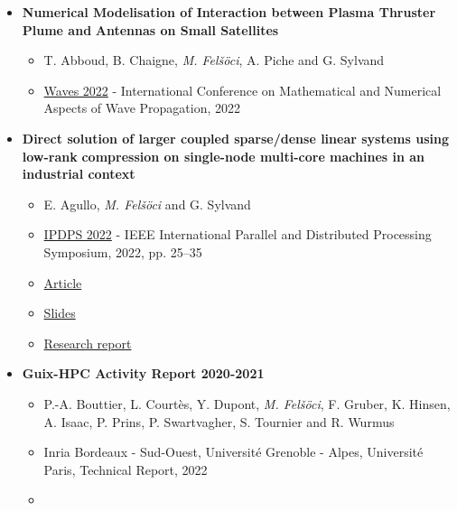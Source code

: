 \documentclass[a4paper, 11pt]{article}
\begin{document}
\begin{itemize}
\item \textbf{Numerical Modelisation of Interaction between Plasma Thruster Plume and}
\textbf{Antennas on Small Satellites}
\begin{itemize}
\item T. Abboud, B. Chaigne, \emph{M. Felšöci}, A. Piche and G. Sylvand
\item \href{https://waves2022.apps.math.cnrs.fr/}{Waves 2022} - International
Conference on Mathematical and Numerical Aspects of Wave Propagation, 2022
\end{itemize}
\item \textbf{Direct solution of larger coupled sparse/dense linear systems using low-rank}
\textbf{compression on single-node multi-core machines in an industrial context}
\begin{itemize}
\item E. Agullo, \emph{M. Felšöci} and G. Sylvand
\item \href{http://www.ipdps.org/ipdps2022/index.html}{IPDPS 2022} - IEEE
International Parallel and Distributed Processing Symposium, 2022,
pp. 25–35
\item \begin{center}
\end{center}
\href{https://doi.ieeecomputersociety.org/10.1109/IPDPS53621.2022.00012}{Article}
\item \begin{center}
\end{center}
\href{https://thesis-mfelsoci.gitlabpages.inria.fr/thesis/slides/ipdps-2022.pdf}{Slides}
\item \begin{center}
\end{center} \href{https://hal.inria.fr/hal-03557692/document}{Research
report}
\end{itemize}
\item \textbf{Guix-HPC Activity Report 2020-2021}
\begin{itemize}
\item P.-A. Bouttier, L. Courtès, Y. Dupont, \emph{M. Felšöci}, F. Gruber, K. Hinsen,
A. Isaac, P. Prins, P. Swartvagher, S. Tournier and R. Wurmus
\item Inria Bordeaux - Sud-Ouest, Université Grenoble - Alpes, Université Paris,
Technical Report, 2022
\item \begin{center}

\end{center}
\end{itemize}
\end{itemize}
\end{document}
